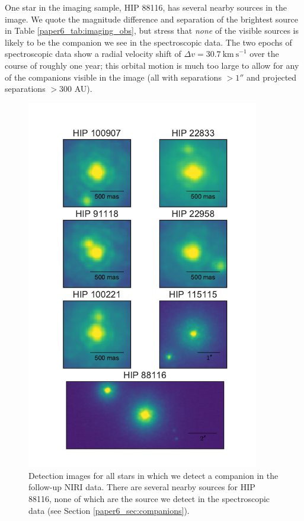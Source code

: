 One star in the imaging sample, HIP 88116, has several nearby sources in the image. We quote the magnitude difference and separation of the brightest source in Table \ref{paper6_tab:imaging_obs}, but stress that \emph{none} of the visible sources is likely to be the companion we see in the spectroscopic data. The two epochs of spectroscopic data show a radial velocity shift of $\Delta v = 30.7\ \mathrm{km\ s}^{-1}$ over the course of roughly one year; this orbital motion is much too large to allow for any of the companions visible in the image (all with separations $ > 1''$ and projected separations $ > 300$ AU).

\begin{figure}
\centering
\includegraphics[width=4in]{Figures/paper6_Imaging_Data.pdf}
\caption{Detection images for all stars in which we detect a companion in the follow-up NIRI data. 
There are several nearby sources for HIP 88116, none of which are the source we detect in the 
spectroscopic data (see Section \ref{paper6_sec:companions}).}
\label{paper6_fig:images}
\end{figure}





